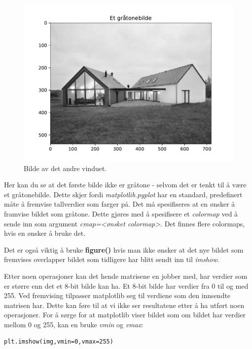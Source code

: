\documentclass[%
oneside,                 %
final,                   %
10pt]{article}
\begin{document}
\begin{figure}[!ht]  %
  \centerline{\includegraphics[width=0.9\linewidth]{Figure_2.pdf}}
  \caption{
  Bilde av det andre vinduet.
  }
\end{figure}


Her kan du se at det første bilde ikke er gråtone - selvom det er tenkt til å være et gråtonebilde. Dette skjer fordi \emph{matplotlib.pyplot} har en standard, predefinert måte å fremvise tallverdier som farger på.
Det må spesifiseres at en ønsker å framvise bildet som gråtone. Dette gjøres med å spesifisere et \emph{colormap} ved å sende inn som argument \emph{cmap=<ønsket colormap>}. Det finnes flere colormaps, hvis en ønsker å bruke det.

Det er også viktig å bruke \textbf{figure()} hvis man ikke ønsker at det nye bildet som fremvises overlapper bildet som tidligere har blitt sendt inn til \emph{imshow}.



\vspace{3mm}


Etter noen operasjoner kan det hende matrisene en jobber med, har verdier som er større enn det et 8-bit bilde kan ha. Et 8-bit bilde har verdier fra 0 til og med 255.
Ved fremvising tilpasser matplotlib seg til verdiene som den innsendte matrisen har. Dette kan føre til at vi ikke ser resultatene etter å ha utført noen operasjoner.
For å sørge for at matplotlib viser bildet som om bildet har verdier mellom 0 og 255, kan en bruke \emph{vmin} og \emph{vmax}:
\begin{verbatim}
plt.imshow(img,vmin=0,vmax=255)
\end{verbatim}
\end{document}
